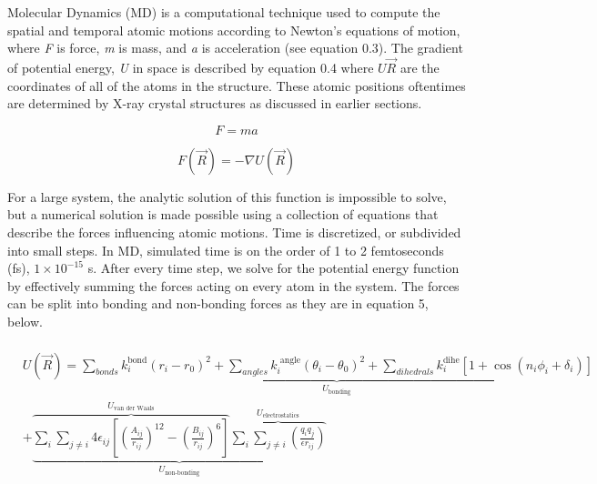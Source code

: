 \documentclass[12pt]{ucsddissertation}
\begin{document}
\begin{dissertationintroduction}
Molecular Dynamics (MD) is a computational technique used to compute the spatial and temporal atomic motions according to Newton's equations of motion, where \textit{F} is force, \textit{m} is mass, and \textit{a} is acceleration (see equation 0.3). The gradient of potential energy, \textit{U} in space is described by equation 0.4 where $U \vec { R }$ are the coordinates of all of the atoms in the structure. These atomic positions oftentimes are determined by X-ray crystal structures as discussed in earlier sections.

\begin{equation}
   F = ma
\end{equation}

\begin{equation}
   F ( \vec { R } ) = - \nabla U ( \vec { R } )
\end{equation}

For a large system, the analytic solution of this function is impossible to solve, but a numerical solution is made possible using a collection of equations that describe the forces influencing atomic motions. Time is discretized, or subdivided into small steps. In MD, simulated time is on the order of 1 to 2 femtoseconds (fs), $1\times10^{-15}$ s. After every time step, we solve for the potential energy function by effectively summing the forces acting on every atom in the system. The forces can be split into bonding and non-bonding forces as they are in equation 5, below.  

\begin{align}
  \label{eq:eight}
   \begin{split}
    \begin{gathered}
     U ( \vec { R } ) = \underbrace { \sum _ {bonds} k _ { i } ^ \text {bond} \left( r _ { i } - r _ { 0 } \right) ^ { 2 } +  \sum _ { angles } k _ { i } ^ { \text { angle} } \left( \theta _ { i } - \theta _ { 0 } \right) ^ { 2 } + \sum _ { {dihedrals} } k _ { i } ^ {\text{dihe}} \left[ 1 + \cos \left( n _ { i } \phi _ { i } + \delta _ { i } \right) \right]}_{ U _ {\text{bonding}} }\\
     + \underbrace{\overbrace { \sum _ { i } \sum _ { j \neq i } 4 \epsilon _ { i j } \left[ \left( \frac { A _ { i j } } { r _ { i j } } \right) ^ { 12 } - \left( \frac { B _ { i j } } { r _ { i j } } \right) ^ { 6 } \right]}^{U_{\text{van der Waals}}}
      \overbrace{\sum _ { i } \sum _ { j \neq i } \left(\frac {q _ { i } q _ { j } } { \epsilon r _ { i j } }\right)}^{ U _ { \text{electrostatics} }}} _ { U _ { \text{non-bonding}}}
    \end{gathered}
  \end{split}
\end{align}
  

\end{dissertationintroduction}
\end{document}
